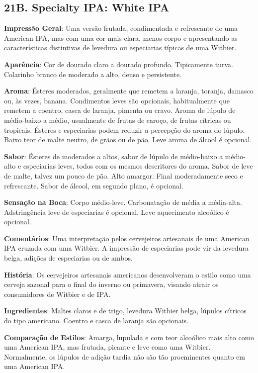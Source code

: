 \subsection*{21B. Specialty IPA: White IPA}
\textbf{Impressão Geral}: Uma versão frutada, condimentada e refrescante de uma American IPA, mas com uma cor mais clara, menos corpo e apresentando as características distintivas de levedura ou especiarias típicas de uma Witbier.

\textbf{Aparência}: Cor de dourado claro a dourado profundo. Tipicamente turva. Colarinho branco de moderado a alto, denso e persistente.

\textbf{Aroma}: Ésteres moderados, geralmente que remetem a laranja, toranja, damasco ou, às vezes, banana. Condimentos leves são opcionais, habitualmente que remetem a coentro, casca de laranja, pimenta ou cravo. Aroma de lúpulo de médio-baixo a médio, usualmente de frutas de caroço, de frutas cítricas ou tropicais. Ésteres e especiarias podem reduzir a percepção do aroma do lúpulo. Baixo teor de malte neutro, de grãos ou de pão. Leve aroma de álcool é opcional.

\textbf{Sabor}: Ésteres de moderados a altos, sabor de lúpulo de médio-baixo a médio-alto e especiarias leves, todos com os mesmos descritores do aroma. Sabor de leve de malte, talvez um pouco de pão. Alto amargor. Final moderadamente seco e refrescante. Sabor de álcool, em segundo plano, é opcional.

\textbf{Sensação na Boca}: Corpo médio-leve. Carbonatação de média a média-alta. Adstringência leve de especiarias é opcional. Leve aquecimento alcoólico é opcional.

\textbf{Comentários}: Uma interpretação pelos cervejeiros artesanais de uma American IPA cruzada com uma Witbier. A impressão de especiarias pode vir da levedura belga, adições de especiarias ou de ambos.

\textbf{História}: Os cervejeiros artesanais americanos desenvolveram o estilo como uma cerveja sazonal para o final do inverno ou primavera, visando atrair os consumidores de Witbier e de IPA.

\textbf{Ingredientes}: Maltes claros e de trigo, levedura Witbier belga, lúpulos cítricos do tipo americano. Coentro e casca de laranja são opcionais.

\textbf{Comparação de Estilos}: Amarga, lupulada e com teor alcoólico mais alto como uma American IPA, mas frutada, picante e leve como uma Witbier. Normalmente, os lúpulos de adição tardia não são tão proeminentes quanto em uma American IPA.

